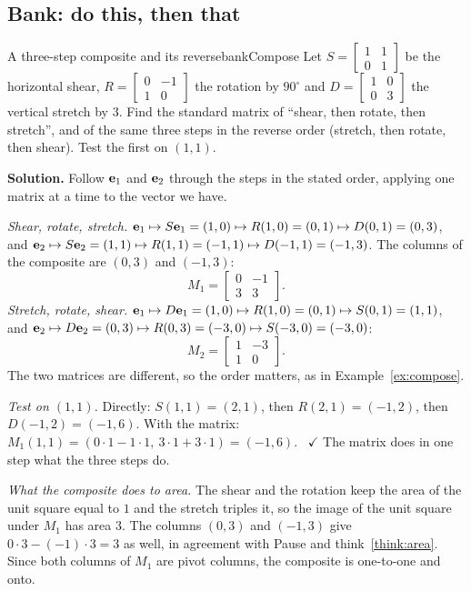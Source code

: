 \documentclass[11pt]{article}
\begin{document}
\subsection*{Bank: do this, then that}

\begin{exmp}{A three-step composite and its reverse}{bankCompose}
Let $S=\begin{bmatrix}1&1\\0&1\end{bmatrix}$ be the horizontal shear, $R=\begin{bmatrix}0&-1\\1&0\end{bmatrix}$ the rotation by $90^\circ$ and $D=\begin{bmatrix}1&0\\0&3\end{bmatrix}$ the vertical stretch by $3$. Find the standard matrix of ``shear, then rotate, then stretch'', and of the same three steps in the reverse order (stretch, then rotate, then shear). Test the first on $(1,1)$.

\textbf{Solution.} Follow $\mathbf{e}_1$ and $\mathbf{e}_2$ through the steps in the stated order, applying one matrix at a time to the vector we have.

\emph{Shear, rotate, stretch.} $\mathbf{e}_1\mapsto S\mathbf{e}_1=(1,0)\mapsto R(1,0)=(0,1)\mapsto D(0,1)=(0,3)$, and $\mathbf{e}_2\mapsto S\mathbf{e}_2=(1,1)\mapsto R(1,1)=(-1,1)\mapsto D(-1,1)=(-1,3)$. The columns of the composite are $(0,3)$ and $(-1,3)$:
\[
M_1=\begin{bmatrix}0&-1\\3&3\end{bmatrix}.
\]
\emph{Stretch, rotate, shear.} $\mathbf{e}_1\mapsto D\mathbf{e}_1=(1,0)\mapsto R(1,0)=(0,1)\mapsto S(0,1)=(1,1)$, and $\mathbf{e}_2\mapsto D\mathbf{e}_2=(0,3)\mapsto R(0,3)=(-3,0)\mapsto S(-3,0)=(-3,0)$:
\[
M_2=\begin{bmatrix}1&-3\\1&0\end{bmatrix}.
\]
The two matrices are different, so the order matters, as in Example~\ref{ex:compose}.

\emph{Test on $(1,1)$.} Directly: $S(1,1)=(2,1)$, then $R(2,1)=(-1,2)$, then $D(-1,2)=(-1,6)$. With the matrix: $M_1(1,1)=(0\cdot1-1\cdot1,\ 3\cdot1+3\cdot1)=(-1,6)$. \ $\checkmark$ The matrix does in one step what the three steps do.

\emph{What the composite does to area.} The shear and the rotation keep the area of the unit square equal to $1$ and the stretch triples it, so the image of the unit square under $M_1$ has area $3$. The columns $(0,3)$ and $(-1,3)$ give $0\cdot3-(-1)\cdot3=3$ as well, in agreement with Pause and think~\ref{think:area}. Since both columns of $M_1$ are pivot columns, the composite is one-to-one and onto.
\end{exmp}
\end{document}
